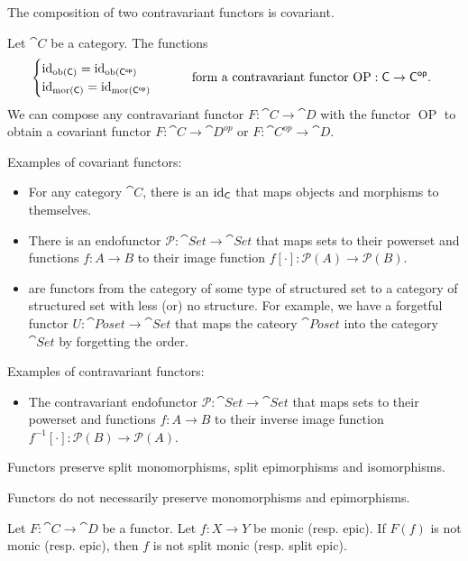 \begin{lemma}
The composition of two contravariant functors is covariant.
\end{lemma}

\begin{lemma}
Let $\cat{C}$ be a category. The functions
\[ \begin{cases}
\operatorname{id}_{\operatorname{ob}(\mathsf{C})} = \operatorname{id}_{\operatorname{ob}(\mathsf{C^{op}})} \\
\operatorname{id}_{\operatorname{mor}(\mathsf{C})} = \operatorname{id}_{\operatorname{mor}(\mathsf{C^{op}})}
\end{cases} \qquad \text{form a contravariant functor $\operatorname{OP}: \mathsf{C} \to \mathsf{C^{op}}$.
} \]
We can compose any contravariant functor $F: \cat{C} \to \cat{D}$ with the functor $\operatorname{OP}$ to obtain a covariant functor $F: \cat{C} \to \cat{D^{op}}$ or $F: \cat{C^{op}} \to \cat{D}$.
\end{lemma}

\begin{example}
Examples of covariant functors:
\begin{itemize}
\item For any category $\cat{C}$, there is an  $\operatorname{id}_{\mathsf{C}}$ that maps objects and morphisms to themselves.
\item There is an endofunctor $\mathcal{P}:\cat{Set} \to \cat{Set}$ that maps sets to their powerset and functions $f:A\to B$ to their image function $f[\cdot]:\mathcal{P}(A)\to \mathcal{P}(B)$.
\item {} are functors from the category of some type of structured set to a category of structured set with less (or) no structure. For example, we have a forgetful functor $U: \cat{Poset} \to \cat{Set}$ that maps the cateory $\cat{Poset}$ into the category $\cat{Set}$ by forgetting the order. 
\end{itemize}
Examples of contravariant functors:
\begin{itemize}
\item The contravariant endofunctor $\mathcal{P}:\cat{Set} \to \cat{Set}$ that maps sets to their powerset and functions $f:A\to B$ to their inverse image function $f^{-1}[\cdot]:\mathcal{P}(B)\to \mathcal{P}(A)$.
\end{itemize}
\end{example}

\begin{lemma} \label{functorMorphismPreservation}
Functors preserve split monomorphisms, split epimorphisms and isomorphisms.
\end{lemma}
Functors do not necessarily preserve monomorphisms and epimorphisms.
\begin{corollary}
Let $F:\cat{C}\to \cat{D}$ be a functor. Let $f:X \to Y$ be monic (resp. epic). If $F(f)$ is not monic (resp. epic), then $f$ is not split monic (resp. split epic).
\end{corollary}

